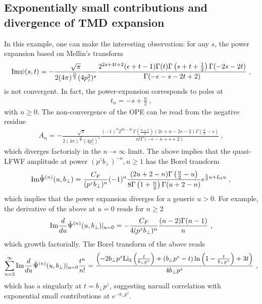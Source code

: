 \documentclass[a4paper,11pt]{article}
\begin{document}
\subsection{Exponentially small contributions and divergence of TMD expansion}  In this example, one can make the interesting observation: for any $s$, the power expansion based on Mellin's transform
\begin{align}
 {\rm Im} \psi(s,t)=-\frac{\sqrt{\pi}}{2(4\pi)^{\frac{D}{2}}(4p_z^2)^{s}}
 \frac{2^{2 s+4 t+2}(\epsilon+t-1)  \Gamma (t) \Gamma \left(s+t+\frac{1}{2}\right) \Gamma (-2s -2t)}{\Gamma (-\epsilon-s-2 t+2)} \ ,
\end{align}
is not convergent. In fact, the power-expansion corresponds to poles at
\begin{align}
t_n=-s+\frac{n}{2} \ ,
\end{align}
with $n\ge 0$.  The non-convergence of the OPE can be read from the negative residue
\begin{align}
A_n= -\frac{\sqrt{\pi}}{2(4\pi)^{\frac{D}{2}}(4p_z^2)^{s}}\frac{(-1)^n 2^{2 n-2 s} \Gamma \left(\frac{n+1}{2}\right) (2 \epsilon+n-2 s-2) \Gamma \left(\frac{n}{2}-s\right)}{n!  \Gamma (-\epsilon-n+s+2)} \ ,
\end{align}
which diverges factorialy in the $n\rightarrow \infty$ limit. The above implies that the quasi-LFWF amplitude at power $(p^zb_\perp)^{-n}, n\ge 1$  has the Borel transform
\begin{align}
{\rm Im} \tilde \Psi^{(n)}(u,b_\perp)=\frac{C_F}{(p^zb_\perp)^n}(-1)^{n}\frac{(2u+2-n)\Gamma\left(\frac{n}{2}-u\right)}{8\Gamma \left(1+\frac{n}{2}\right)\Gamma(u+2-n)}e^{\frac{5}{3}u+L_b u} \ ,
\end{align}
which implies that the power expansion diverges for a generic $u>0$. For example, the derivative of the above at $u=0$ reads for $n \ge 2$
\begin{align}
{\rm Im} \frac{d}{du } \tilde \Psi^{(n)}(u,b_\perp)|_{u=0}=-\frac{C_F}{4(p^zb_\perp)^n}\frac{(n-2)\Gamma(n-1)}{n} \ ,
\end{align}
which growth factorially. The Borel transform of the above reads
\begin{align}
\sum_{n=2}^{\infty}{\rm Im} \frac{d}{du } \tilde \Psi^{(n)}(u,b_\perp)|_{u=0}\frac{t^n}{n!}=\frac{\left(-2 b_\perp p^z \text{Li}_2\left(\frac{t}{b_\perp p^z}\right)+(b_\perp p^z-t) \ln\left(1-\frac{t}{b_\perp p^z}\right)+3 t\right)}{4 b_\perp p^z} \ ,
\end{align}
which has a singularly at $t=b_\perp p^z$, suggesting naruall correlation with exponential small contributions at $e^{-b_\perp p^z}$.
\end{document}
